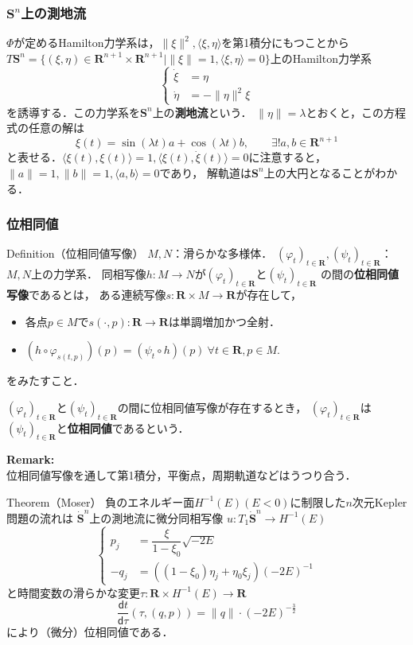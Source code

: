 \documentclass[11pt,%
dvipdfmx,cjk]{beamer}
\newcommand{\rr}{\mathbf{R}}
\def\inner<#1>{\langle #1 \rangle}
\begin{document}
\begin{frame}
\frametitle{\(\mathbf{S}^{n}\)上の測地流}
\(\Phi\)が定めるHamilton力学系は，\(\|\xi\|^{2}, \inner<\xi, \eta>\)を第1積分にもつことから
\(T\mathbf{S}^{n} = \{(\xi,\eta) \in \rr^{n + 1} \times \rr^{n + 1} \mid 
\|\xi\| = 1, \inner<\xi, \eta> = 0\}\)上のHamilton力学系
\[
\begin{cases}
	\dot{\xi} &=  \eta \\ 
	\dot{\eta} &= -\|\eta\|^{2}\xi
\end{cases}	
\]
を誘導する．この力学系を\(\mathbf{S}^{n}\)上の\textbf{測地流}という．
\(\|\eta\| = \lambda\)とおくと，この方程式の任意の解は
\[
	\xi(t) = \sin(\lambda t)a + \cos(\lambda t)b, \qquad \exists! a,b \in \rr^{n+1}
\]
と表せる．\(\inner<\xi(t), \xi(t)> = 1, \inner<\xi(t), \dot{\xi}(t)> = 0\)に注意すると，
\(\|a\| =1, \|b\| =1, \inner<a,b> = 0\)であり，
解軌道は\(\mathbf{S}^{n}\)上の大円となることがわかる．
\end{frame}

\begin{frame}
\frametitle{位相同値}
\begin{block}{Definition（位相同値写像）}
	\(M,N\)：滑らかな多様体．
	\((\varphi_{t})_{t \in \rr}, (\psi_{t})_{t \in \rr}\)：\(M, N\)上の力学系．
	同相写像\(h\colon M \to N\)が\((\varphi_{t})_{t \in \rr}\)と\((\psi_{t})_{t \in \rr}\)
	の間の\textbf{位相同値写像}であるとは，
	ある連続写像\(s\colon \rr \times M \to \rr\)が存在して，
	\begin{itemize}
		\item
		各点\(p \in M\)で\(s(\cdot, p)\colon \rr \to \rr\)は単調増加かつ全射．
		
		\item
		\((h \circ \varphi_{s(t,p)})(p) = (\psi_{t} \circ h)(p)\ \forall t \in \rr, p \in M.\)
	\end{itemize}
	をみたすこと．
\end{block}
\((\varphi_{t})_{t \in \rr}\)と\((\psi_{t})_{t \in \rr}\)の間に位相同値写像が存在するとき，
\((\varphi_{t})_{t \in \rr}\)は\((\psi_{t})_{t \in \rr}\)と\textbf{位相同値}であるという．

\textbf{Remark:}\\
位相同値写像を通して第1積分，平衡点，周期軌道などはうつり合う．
\end{frame}

\begin{frame}
\begin{block}{Theorem（Moser）}
負のエネルギー面\(H^{-1}(E)\)\((E < 0)\)に制限した\(n\)次元Kepler問題の流れは
\(\dot{\mathbf{S}}^{n}\)上の測地流に微分同相写像
\(u\colon T_{1}\dot{\mathbf{S}}^{n} \to H^{-1}(E)\)
\[
\begin{cases}
	p_{j} &= \dfrac{\xi}{1 - \xi_{0}}\sqrt{-2E} \\
	-q_{j} &= ((1 - \xi_{0})\eta_{j} + \eta_{0}\xi_{j})(-2E)^{-1}
\end{cases}
\]
と時間変数の滑らかな変更\(\tau: \rr \times H^{-1}(E) \to \rr\)
\[
	\frac{\mathsf{d}t}{\mathsf{d}\tau}(\tau,(q,p)) = \|q\| \cdot (-2E)^{-\frac{3}{2}}
\]
により（微分）位相同値である．
\end{block}
\end{frame}
\end{document}
